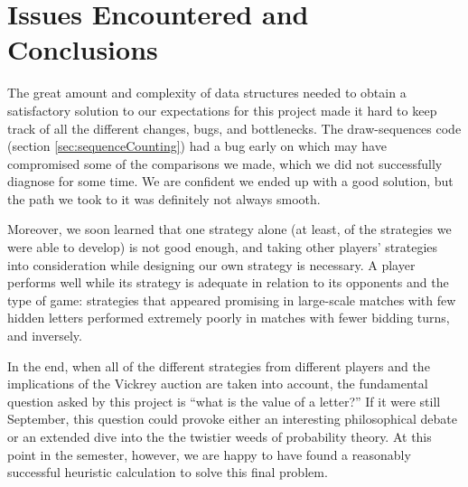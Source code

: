 \documentclass[11pt]{article}
\begin{document}
\section{Issues Encountered and Conclusions}

The great amount and complexity of data structures needed to obtain a satisfactory solution to our expectations for this project made it hard to keep track of all the different changes, bugs, and bottlenecks. The draw-sequences code (section \ref{sec:sequenceCounting}) had a bug early on which may have compromised some of the comparisons we made, which we did not successfully diagnose for some time.  We are confident we ended up with a good solution, but the path we took to it was definitely not always smooth.

Moreover, we soon learned that one strategy alone (at least, of the strategies we were able to develop) is not good enough, and taking other players' strategies into consideration while designing our own strategy is necessary. A player performs well while its strategy is adequate in relation to its opponents and the type of game: strategies that appeared promising in large-scale matches with few hidden letters performed extremely poorly in matches with fewer bidding turns, and inversely.

In the end, when all of the different strategies from different players and the implications of the Vickrey auction are taken into account, the fundamental question asked by this project is ``what is the value of a letter?''  If it were still September, this question could provoke either an interesting philosophical debate or an extended dive into the the twistier weeds of probability theory.  At this point in the semester, however, we are happy to have found a reasonably successful heuristic calculation to solve this final problem.
\end{document}
